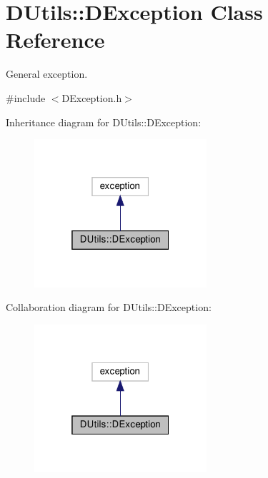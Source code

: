 \hypertarget{classDUtils_1_1DException}{}\section{D\+Utils\+:\+:D\+Exception Class Reference}
\label{classDUtils_1_1DException}


General exception.  




{\ttfamily \#include $<$D\+Exception.\+h$>$}



Inheritance diagram for D\+Utils\+:\+:D\+Exception\+:\nopagebreak
\begin{figure}[H]
\begin{center}
\leavevmode
\includegraphics[width=181pt]{classDUtils_1_1DException__inherit__graph}
\end{center}
\end{figure}


Collaboration diagram for D\+Utils\+:\+:D\+Exception\+:\nopagebreak
\begin{figure}[H]
\begin{center}
\leavevmode
\includegraphics[width=181pt]{classDUtils_1_1DException__coll__graph}
\end{center}
\end{figure}
